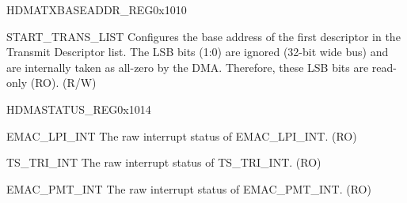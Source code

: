 \begin{register}{H}{DMATXBASEADDR\_REG}{0x1010}\label{regdesc:DMATXBASEADDRREG}
%
\regnewline%
\begin{regdesc}\begin{reglist}
\item [START\_TRANS\_LIST] Configures the base address of the first descriptor in the Transmit Descriptor list. The LSB bits (1:0) are ignored (32-bit wide bus) and are internally taken as all-zero by the DMA. Therefore, these LSB bits are read-only (RO). (R/W)
\end{reglist}\end{regdesc}
\end{register}


\begin{register}{H}{DMASTATUS\_REG}{0x1014}\label{regdesc:DMASTATUSREG}
%
%
%
%
%
%
%
%
%
%
%
%
%
%
%
%
%
%
%
%
%
%
%
%
\regnewline%
\begin{regdesc}\begin{reglist}
\item [EMAC\_LPI\_INT] The raw interrupt status of EMAC\_LPI\_INT. (RO)
\item [TS\_TRI\_INT] The raw interrupt status of TS\_TRI\_INT. (RO)
\item [EMAC\_PMT\_INT] The raw interrupt status of EMAC\_PMT\_INT. (RO)


\end{reglist}
\end{regdesc}
\end{register}
